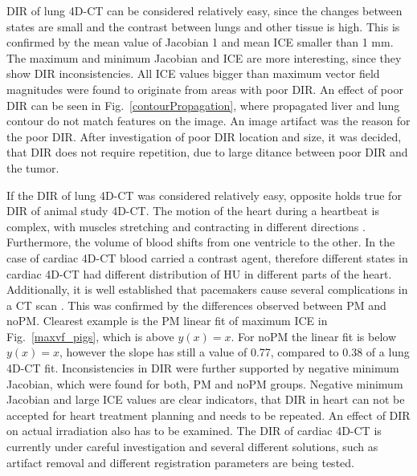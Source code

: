 \documentclass[type=dr, dr=rernat, accentcolor=tud7b,colorbacktitle, bigchapter, openright, twoside, 12pt ]{tudthesis}
\begin{document}
DIR of lung 4D-CT can be considered relatively easy, since the changes between states are small and the contrast between lungs and other tissue is high. 
This is confirmed by the mean value of Jacobian 1 and mean ICE smaller than 1 mm. The maximum and minimum Jacobian and ICE are more interesting, since they show 
DIR inconsistencies. All ICE values bigger than maximum vector field magnitudes were found to originate from areas with poor DIR. An effect of poor DIR can be seen in Fig.~\ref{contourPropagation},
where propagated liver and lung contour do not match features on the image. An image artifact was the reason for the poor DIR. After investigation of poor DIR location and size, 
it was decided, that DIR does not require repetition, due to large ditance between poor DIR and the tumor.

If the DIR of lung 4D-CT was considered relatively easy, opposite holds true for DIR of animal study 4D-CT. The motion of the heart during a heartbeat is complex, 
with muscles stretching and contracting in different directions \cite{Seeley2007}. Furthermore,
the volume of blood shifts from one ventricle to the other. In the case of cardiac 4D-CT blood carried a contrast agent, therefore different states in cardiac 4D-CT 
had different distribution of HU in different parts of the heart. Additionally, it is well established that pacemakers cause several complications in a CT scan \cite{Mak2012}. This was
confirmed by the differences observed between PM and noPM. Clearest example is the PM linear fit of maximum ICE in Fig.~\ref{maxvf_pigs}, which is above $y(x) = x$. For noPM the linear
fit is below $y(x)=x$, however the slope has still a value of 0.77, compared to 0.38 of a lung 4D-CT fit. Inconsistencies in DIR were further supported by negative minimum Jacobian, which were found for both,
PM and noPM groups. Negative minimum Jacobian and large ICE values are clear indicators, that DIR in heart can not be 
accepted for heart treatment planning and needs to be repeated. An effect of DIR on actual irradiation also has to be examined.
The DIR of cardiac 4D-CT is currently under careful investigation
and several different solutions, such as artifact removal and different registration parameters are being tested.
\end{document}
